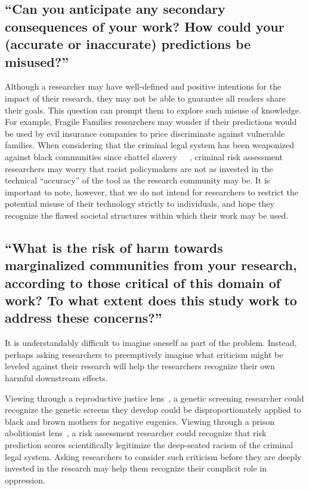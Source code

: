 \documentclass[12pt]{article}
\begin{document}
    \subsection{``Can you anticipate any secondary consequences of your work? How could your (accurate or inaccurate) predictions be misused?''}
        
        Although a researcher may have well-defined and positive intentions for the impact of their research, they may not be able to guarantee all readers share their goals. This question can prompt them to explore such misuse of knowledge. For example, Fragile Families researchers may wonder if their predictions would be used by evil insurance companies to price discriminate against vulnerable families. When considering that the criminal legal system has been weaponized against black communities since chattel slavery~\cite{new-jim-crow}~\cite{abolition-constitutionalism}~\cite{race-after-tech}, criminal risk assessment researchers may worry that racist policymakers are not as invested in the technical ``accuracy'' of the tool as the research community may be. It is important to note, however, that we do not intend for researchers to restrict the potential misuse of their technology strictly to individuals, and hope they recognize the flawed societal structures within which their work may be used. 

    \subsection{``What is the risk of harm towards marginalized communities from your research, according to those critical of this domain of work? To what extent does this study work to address these concerns?''}
    
        It is understandably difficult to imagine oneself as part of the problem. Instead, perhaps asking researchers to preemptively imagine what criticism might be leveled against their research will help the researchers recognize their own harmful downstream effects. 
        
        Viewing through a reproductive justice lens~\cite{welchPhD}, a genetic screening researcher could recognize the genetic screens they develop could be disproportionately applied to black and brown mothers for negative eugenics. Viewing through a prison abolitionist lens~\cite{prisons-obsolete}, a risk assessment researcher could recognize that risk prediction scores scientifically legitimize the deep-seated racism of the criminal legal system. Asking researchers to consider such criticism before they are deeply invested in the research may help them recognize their complicit role in oppression. 
        
\end{document}
